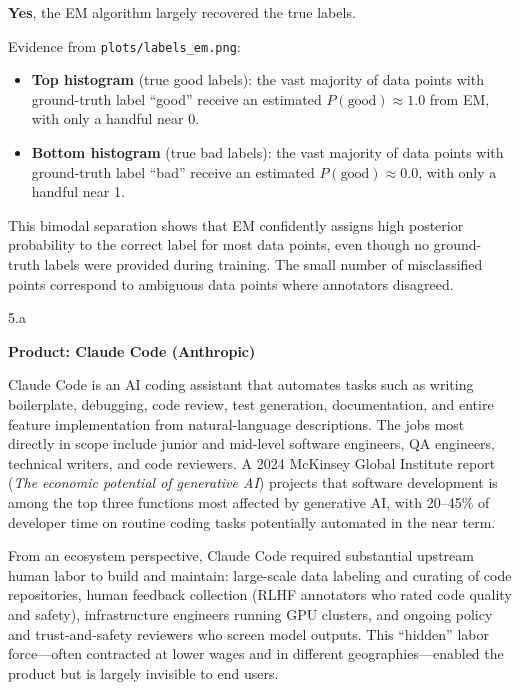 \begin{answer}
  \textbf{Yes}, the EM algorithm largely recovered the true labels.

  Evidence from \texttt{plots/labels\_em.png}:
  \begin{itemize}
    \item \textbf{Top histogram} (true good labels): the vast majority of data points with ground-truth label ``good'' receive an estimated $P(\text{good}) \approx 1.0$ from EM, with only a handful near 0.
    \item \textbf{Bottom histogram} (true bad labels): the vast majority of data points with ground-truth label ``bad'' receive an estimated $P(\text{good}) \approx 0.0$, with only a handful near 1.
  \end{itemize}

  This bimodal separation shows that EM confidently assigns high posterior probability to the correct label for most data points, even though no ground-truth labels were provided during training. The small number of misclassified points correspond to ambiguous data points where annotators disagreed.
  \end{answer}

\clearpage


\LARGE
5.a
\normalsize

\begin{answer}
  \textbf{Product: Claude Code (Anthropic)}

  Claude Code is an AI coding assistant that automates tasks such as writing boilerplate, debugging, code review, test generation, documentation, and entire feature implementation from natural-language descriptions. The jobs most directly in scope include junior and mid-level software engineers, QA engineers, technical writers, and code reviewers. A 2024 McKinsey Global Institute report (\textit{The economic potential of generative AI}) projects that software development is among the top three functions most affected by generative AI, with 20--45\% of developer time on routine coding tasks potentially automated in the near term.

  From an ecosystem perspective, Claude Code required substantial upstream human labor to build and maintain: large-scale data labeling and curating of code repositories, human feedback collection (RLHF annotators who rated code quality and safety), infrastructure engineers running GPU clusters, and ongoing policy and trust-and-safety reviewers who screen model outputs. This ``hidden'' labor force---often contracted at lower wages and in different geographies---enabled the product but is largely invisible to end users.
\end{answer}

